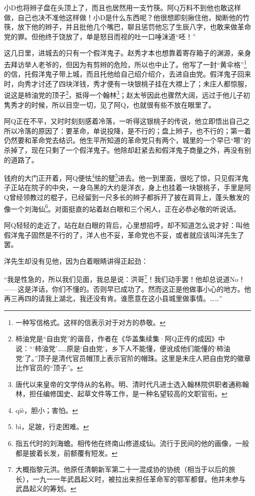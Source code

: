 \documentclass[12pt,UTF8]{ctexbook}
\begin{document}
小D也将辫子盘在头顶上了，而且也居然用一支竹筷。阿Q万料不到他也敢这样做，自己也决不准他这样做！小D是什么东西呢？他很想即刻揪住他，拗断他的竹筷，放下他的辫子，并且批他几个嘴巴，聊且惩罚他忘了生辰八字，也敢来做革命党的罪。但他终于饶放了，单是怒目而视的吐一口唾沫道“呸！”

这几日里，进城去的只有一个假洋鬼子。赵秀才本也想靠着寄存箱子的渊源，亲身去拜访举人老爷的，但因为有剪辫的危险，所以也中止了。他写了一封“黄伞格”\footnote{一种写信格式。这样的信表示对于对方的恭敬。}的信，托假洋鬼子带上城，而且托他给自己绍介绍介，去进自由党。假洋鬼子回来时，向秀才讨还了四块洋钱，秀才便有一块银桃子挂在大襟上了；未庄人都惊服，说这是柿油党的顶子\footnote{柿油党是“自由党”的谐音，作者在《华盖集续集·阿Q正传的成因》中说：“‘柿油党’……原是‘自由党’，乡下人不能懂，便讹成他们能懂的‘柿油党’了。”顶子是清代官员帽顶上表示官阶的帽珠。这里是未庄人把自由党的徽章比作官员的“顶子”。}，抵得一个翰林\footnote{唐代以来皇帝的文学侍从的名称。明、清时代凡进士选入翰林院供职者通称翰林，担任编修国史、起草文件等工作，是一种名望较高的文职官衔。}；赵太爷因此也骤然大阔，远过于他儿子初隽秀才的时候，所以目空一切，见了阿Q，也就很有些不放在眼里了。

阿Q正在不平，又时时刻刻感着冷落，一听得这银桃子的传说，他立即悟出自己之所以冷落的原因了：要革命，单说投降，是不行的；盘上辫子，也不行的；第一着仍然要和革命党去结识。他生平所知道的革命党只有两个，城里的一个早已“嚓”的杀掉了，现在只剩了一个假洋鬼子。他除却赶紧去和假洋鬼子商量之外，再没有别的道路了。

钱府的大门正开着，阿Q便怯\footnote{qi\`e，胆小；害怕。}怯的躄\footnote{b\`i，足跛，行走困难。}进去。他一到里面，很吃了惊，只见假洋鬼子正站在院子的中央，一身乌黑的大约是洋衣，身上也挂着一块银桃子，手里是阿Q曾经领教过的棍子，已经留到一尺多长的辫子都拆开了披在肩背上，蓬头散发的像一个刘海仙\footnote{指五代时的刘海蟾。相传他在终南山修道成仙。流行于民间的他的画像，一般都是披着长发，前额覆有短发。}。对面挺直的站着赵白眼和三个闲人，正在必恭必敬的听说话。

阿Q轻轻的走近了，站在赵白眼的背后，心里想招呼，却不知道怎么说才好：叫他假洋鬼子固然是不行的了，洋人也不妥，革命党也不妥，或者就应该叫洋先生了罢。

洋先生却没有见他，因为白着眼睛讲得正起劲：

“我是性急的，所以我们见面，我总是说：洪哥\footnote{大概指黎元洪。他原任清朝新军第二十一混成协的协统（相当于以后的旅长），一九一一年武昌起义时，被拉出来担任革命军的鄂军都督。他并未参与武昌起义的筹划。}！我们动手罢！他却总说道No！——这是洋话，你们不懂的。否则早已成功了。然而这正是他做事小心的地方。他再三再四的请我上湖北，我还没有肯。谁愿意在这小县城里做事情。……”
\end{document}
